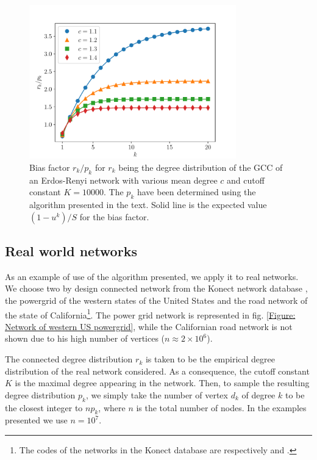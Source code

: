 \documentclass[
11pt, %
english, %
singlespacing, %
nolistspacing, %
liststotoc, %
headsepline, %
]{MastersDoctoralThesis} %
\begin{document}
\begin{figure}
	\includegraphics[width=0.8\textwidth]{ER_reconstruction.pdf}
	\caption{Bias factor $r_k/p_k$ for $r_k$ being the degree distribution of the GCC of an Erdos-Renyi network with various mean degree $c$ and cutoff constant $K = 10000$. The $p_k$ have been determined using the algorithm presented in the text. Solid line is the expected value $(1 - u^k)/S$ for the bias factor.}
	\label{Figure: Erdos-Renyi reconstruction}
\end{figure}

\subsection{Real world networks}

As an example of use of the algorithm presented, we apply it to real networks. We choose two by design connected network from the Konect network database \cite{kunegis2013konect}, the powergrid of the western states of the United States and the road network of the state of California\footnote{The codes of the networks in the Konect database are respectively  and .}. The power grid network is represented in fig. \ref{Figure: Network of western US powergrid}, while the Californian road network is not shown due to his high number of vertices ($n \approx 2 \times 10^6$).

The connected degree distribution $r_k$ is taken to be the empirical degree distribution of the real network considered. As a consequence, the cutoff constant $K$ is the maximal degree appearing in the network. Then, to sample the resulting degree distribution $p_k$, we simply take the number of vertex $d_k$ of degree $k$ to be the closest integer to $n p_k$, where $n$ is the total number of nodes. In the examples presented we use $n = 10^7$.
\end{document}
